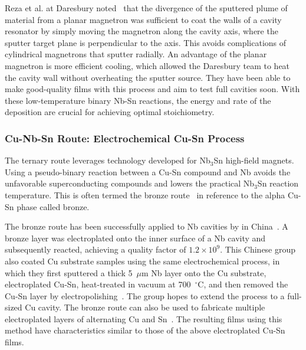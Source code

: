     Reza et al. at Daresbury noted~\cite{valizadehSynthesisNbAlternative2022, turnerFacilityCharacterisationPlanar2022, turnerInvestigationMagneticField2026} that the divergence of the sputtered plume of material from a planar magnetron was sufficient to coat the walls of a cavity resonator by simply moving the magnetron along the cavity axis, where the sputter target plane is perpendicular to the axis. This avoids complications of cylindrical magnetrons that sputter radially. An advantage of the planar magnetron is more efficient cooling, which allowed the Daresbury team to heat the cavity wall without overheating the sputter source. They have been able to make good-quality films with this process and aim to test full cavities soon. With these low-temperature binary Nb-Sn reactions, the energy and rate of the deposition are crucial for achieving optimal stoichiometry.
    
    \subsubsection{Cu-Nb-Sn Route: Electrochemical Cu-Sn Process}
    
    The ternary route leverages technology developed for Nb$_3$Sn high-field magnets. Using a pseudo-binary reaction between a Cu-Sn compound and Nb avoids the unfavorable superconducting compounds and lowers the practical Nb$_3$Sn reaction temperature. This is often termed the bronze route~\cite{suenagaChemicalCompositionsGrain1983, tachikawaHighFieldNb3SnSuperconductors1997} in reference to the alpha Cu-Sn phase called bronze.

    The bronze route has been successfully applied to Nb cavities by \citeauthor{luDevelopmentPerformanceFirst2022} in China~\cite{luDevelopmentPerformanceFirst2022}. A bronze layer was electroplated onto the inner surface of a Nb cavity and subsequently reacted, achieving a quality factor of $1.2 \times 10^9$. This Chinese group also coated Cu substrate samples using the same electrochemical process, in which they first sputtered a thick 5~$\mu$m Nb layer onto the Cu substrate, electroplated Cu-Sn, heat-treated in vacuum at 700~$^\circ$C, and then removed the Cu-Sn layer by electropolishing~\cite{Lu:2023wyr}. The group hopes to extend the process to a full-sized Cu cavity. The bronze route can also be used to fabricate multiple electroplated layers of alternating Cu and Sn~\cite{franzSYNTHESISNbSnCOATINGS2017}. The resulting films using this method have characteristics similar to those of the above electroplated Cu-Sn films.

